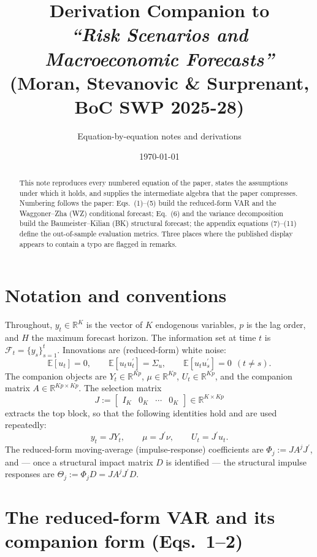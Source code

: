 \documentclass[11pt]{article}
\title{Derivation Companion to\\
\emph{``Risk Scenarios and Macroeconomic Forecasts''}\\
\normalsize (Moran, Stevanovic \& Surprenant, BoC SWP 2025-28)}
\author{Equation-by-equation notes and derivations}
\date{\today}
\newcommand{\E}{\mathbb{E}}
\newcommand{\Fset}{\mathcal{F}}
\newcommand{\R}{\mathbb{R}}
\newcommand{\tp}{^{\prime}}
\theoremstyle{remark}
\begin{document}
\maketitle

\begin{abstract}
\noindent This note reproduces every numbered equation of the paper, states the
assumptions under which it holds, and supplies the intermediate algebra that the
paper compresses. Numbering follows the paper: Eqs.~(1)--(5) build the
reduced-form VAR and the Waggoner--Zha (WZ) conditional forecast; Eq.~(6) and the
variance decomposition build the Baumeister--Kilian (BK) structural forecast; the
appendix equations (7)--(11) define the out-of-sample evaluation metrics. Three
places where the published display appears to contain a typo are flagged in
remarks.
\end{abstract}

\tableofcontents
\bigskip

\section{Notation and conventions}
Throughout, $y_t\in\R^{K}$ is the vector of $K$ endogenous variables, $p$ is the
lag order, and $H$ the maximum forecast horizon. The information set at time $t$
is $\Fset_t=\{y_s\}_{s=1}^{t}$. Innovations are (reduced-form) white noise:
\[
\E[u_t]=0,\qquad \E[u_tu_t\tp]=\Sigma_u,\qquad \E[u_tu_s\tp]=0\ \ (t\neq s).
\]
The companion objects are $Y_t\in\R^{Kp}$, $\mu\in\R^{Kp}$, $U_t\in\R^{Kp}$, and
the companion matrix $A\in\R^{Kp\times Kp}$. The selection matrix
\[
J:=\begin{bmatrix} I_K & 0_K & \cdots & 0_K\end{bmatrix}\in\R^{K\times Kp}
\]
extracts the top block, so that the following identities hold and are used
repeatedly:
\begin{equation}
y_t = J Y_t,\qquad \mu = J\tp\nu,\qquad U_t = J\tp u_t. \tag{$\star$}\label{eq:star}
\end{equation}
The reduced-form moving-average (impulse-response) coefficients are
$\Phi_j:=JA^jJ\tp$, and — once a structural impact matrix $D$ is identified — the
structural impulse responses are $\Theta_j:=\Phi_j D=JA^jJ\tp D$.

\section{The reduced-form VAR and its companion form (Eqs.~1--2)}
\end{document}
